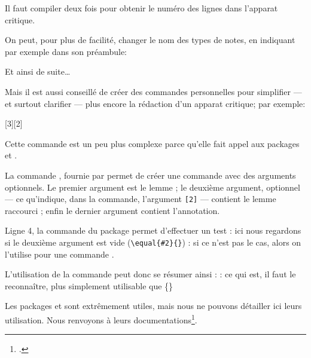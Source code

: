 {\begin{attention}
Il faut compiler deux fois pour obtenir le numéro des lignes dans l'apparat critique.
\end{attention}



On peut, pour plus de facilité, changer le nom des types de notes, en indiquant par exemple dans son préambule: 
\begin{latexcode}
\let\variantes\Afootnote
\let\citations\Bfootnote
\let\eclaircissements\footnoteA
Et ainsi de suite…
\end{latexcode}

Mais il est aussi conseillé de créer des commandes personnelles pour simplifier   --- et surtout clarifier --- plus encore la rédaction d'un apparat critique; par exemple:

\begin{latexcode}
\usepackage{ifthen, xargs}
[3][2]{%
	}
\end{latexcode}

Cette commande est un peu plus complexe parce qu'elle fait appel aux packages  et . 

La commande , fournie par  permet de créer une commande avec des arguments optionnels. Le premier argument est le lemme ; le deuxième argument, optionnel --- ce qu'indique,  dans la commande, l'argument \verb=[2]= --- contient le lemme raccourci ; enfin le dernier argument contient l'annotation.

Ligne 4, la commande  du package  permet d'effectuer un test : ici nous regardons si le deuxième argument est vide (\verb=\equal{#2}{}=) : si ce n'est pas le cas, alors on l'utilise pour une commande .

 L'utilisation de la commande peut donc se résumer ainsi :  : ce qui est, il faut le reconnaître, plus simplement utilisable que \{\}

\begin{plusloins}
Les packages  et  sont extrêmement utiles, mais nous ne pouvons détailler ici leurs utilisation. Nous renvoyons à leurs documentations\footcites{ifthen}{xargs}.
\end{plusloins}





}
